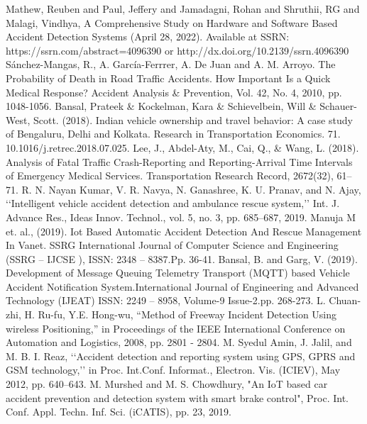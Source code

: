 \documentclass[ 12pt,a4paper,twocolumn,fleqn]{article}
\begin{document}
\begin{adjustwidth}{3.5em}{0pt}
%
%
%
% 
% 
%
\begin{thebibliography}{8}
 Mathew, Reuben and Paul, Jeffery and Jamadagni, Rohan and Shruthii, RG and Malagi, Vindhya, A Comprehensive Study on Hardware and Software Based Accident Detection Systems (April 28, 2022). Available at SSRN: https://ssrn.com/abstract=4096390 or http://dx.doi.org/10.2139/ssrn.4096390
 Sánchez-Mangas, R., A. García-Ferrrer, A. De Juan and A. M. Arroyo. The Probability of   Death in Road Traffic Accidents. How Important Is a Quick Medical Response? Accident Analysis \& Prevention, Vol. 42, No. 4, 2010, pp. 1048-1056.
 Bansal, Prateek \& Kockelman, Kara \& Schievelbein, Will \& Schauer-West, Scott. (2018). Indian vehicle ownership and travel behavior: A case study of Bengaluru, Delhi and Kolkata. Research in Transportation Economics. 71. 10.1016/j.retrec.2018.07.025.
 Lee, J., Abdel-Aty, M., Cai, Q., \& Wang, L. (2018). Analysis of Fatal Traffic Crash-Reporting and Reporting-Arrival Time Intervals of Emergency Medical Services. Transportation Research Record, 2672(32), 61–71.
R. N. Nayan Kumar, V. R. Navya, N. Ganashree, K. U. Pranav, and N. Ajay, ‘‘Intelligent vehicle accident detection and ambulance rescue system,’’ Int. J. Advance Res., Ideas Innov. Technol., vol. 5, no. 3, pp. 685–687, 2019.
 Manuja M et. al., (2019). Iot Based Automatic Accident
Detection And Rescue Management In Vanet. SSRG
International Journal of Computer Science and Engineering
(SSRG – IJCSE ), ISSN: 2348 – 8387.Pp. 36-41.
 Bansal, B. and Garg, V. (2019). Development of Message
Queuing Telemetry Transport (MQTT) based Vehicle
Accident Notification System.International Journal of
Engineering and Advanced Technology (IJEAT) ISSN: 2249 –
8958, Volume-9 Issue-2.pp. 268-273.
L. Chuan-zhi, H. Ru-fu, Y.E. Hong-wu, “Method of Freeway Incident Detection Using wireless Positioning,” in Proceedings of the IEEE International Conference on Automation and Logistics, 2008, pp. 2801 - 2804.
M. Syedul Amin, J. Jalil, and M. B. I. Reaz, ‘‘Accident detection and reporting system using GPS, GPRS and GSM technology,’’ in Proc. Int.Conf. Informat., Electron. Vis. (ICIEV), May 2012, pp. 640–643.
M. Murshed and M. S. Chowdhury, "An IoT based car accident prevention and detection system with smart brake control", Proc. Int. Conf. Appl. Techn. Inf. Sci. (iCATIS), pp. 23, 2019.

\end{thebibliography}
\end{adjustwidth}
\end{document}
